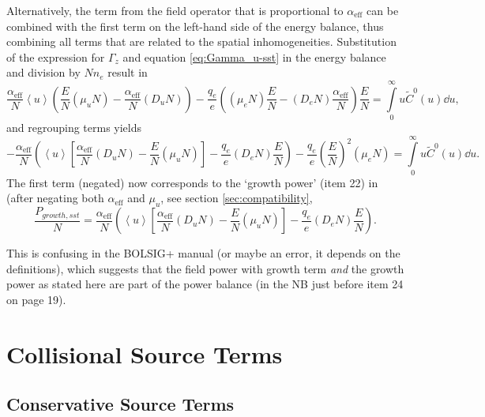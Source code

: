\documentclass{book}
\newcommand{\MEAN}[1]{\ensuremath{\!\left\langle{{#1}}\right\rangle}}
\begin{document}
Alternatively, the term from the field operator
that is proportional to $\alpha_{\text{eff}}$ can be combined with the first term on the
left-hand side of the energy balance, thus combining all terms that are related to the
spatial inhomogeneities. Substitution of the expression for $\Gamma_z$ and equation
\eqref{eq:Gamma_u-sst} in the energy balance and division by $Nn_e$ result in
\begin{equation}
	\frac{\alpha_{\text{eff}}}{N}\MEAN{u}\left(\frac{E}{N}(\mu_u N) - \frac{\alpha_{\text{eff}}}{N}(D_uN)\right)
	- \frac{q_e}{e}\left((\mu_eN) \frac{E}{N} - (D_eN)\frac{\alpha_{\text{eff}}}{N}\right)\frac{E}{N}
	= \int\limits_0^\infty u \tilde{C}^0(u)\dd{u},
\end{equation}
and regrouping terms yields
\begin{equation}
	-\frac{\alpha_{\text{eff}}}{N}\left(
		\MEAN{u}\left[\frac{\alpha_{\text{eff}}}{N}(D_uN) - \frac{E}{N}(\mu_u N)\right]
		- \frac{q_e}{e} (D_eN)\frac{E}{N}
	\right)
	- \frac{q_e}{e}\left(\frac{E}{N}\right)^2(\mu_eN)
	= \int\limits_0^\infty u \tilde{C}^0(u)\dd{u}.
\end{equation}
The first term (negated) now corresponds to the `growth power' (item 22) in \cite[p. 19]{BolsigManual2016}
(after negating both $\alpha_{\text{eff}}$ and $\mu_u$, see section \ref{sec:compatibility},
\begin{equation}
	\frac{P_{growth,sst}}{N} =
	\frac{\alpha_{\text{eff}}}{N}\left(
		\MEAN{u}\left[\frac{\alpha_{\text{eff}}}{N}(D_uN) - \frac{E}{N}(\mu_u N)\right]
		- \frac{q_e}{e} (D_eN)\frac{E}{N}
	\right).
\end{equation}
\begin{framed}
This is confusing in the BOLSIG+ manual (or maybe an error, it depends on the definitions),
which suggests that the field power with growth term {\em and} the growth power
as stated here are part of the power balance (in the NB just before item 24 on page 19).
\end{framed}

\chapter{Collisional Source Terms}
\label{ch:sources}

\section{Conservative Source Terms}
\end{document}
